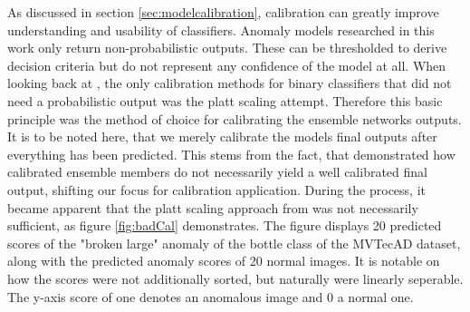 As discussed in section \ref{sec:modelcalibration}, calibration can greatly improve understanding and usability of classifiers. Anomaly models researched in this work only return non-probabilistic 
outputs. These can be thresholded to derive decision criteria but do not represent any confidence of the model at all. When looking back at \cite{Guo_2017_tempscalingetc}, the only calibration 
methods for binary classifiers that did not need a probabilistic output was the platt scaling attempt. Therefore this basic principle was the method of choice for calibrating the ensemble networks 
outputs. It is to be noted here, that we merely calibrate the models final outputs after everything has been predicted. This stems from the fact, that \cite{Wu_2021_shouldbecalibrated} demonstrated 
how calibrated ensemble members do not necessarily yield a well calibrated final output, shifting our focus for calibration application. During the process, it became apparent that the platt 
scaling approach from \cite{Guo_2017_tempscalingetc} was not necessarily sufficient, as figure \ref{fig:badCal} demonstrates. The figure displays 20 predicted scores of the "broken large" anomaly of the bottle class of the MVTecAD dataset, 
along with the predicted anomaly scores of 20 normal images. It is notable on how the scores were not additionally sorted, but naturally 
were linearly seperable. The y-axis score of one denotes an anomalous image and 0 a normal one.


